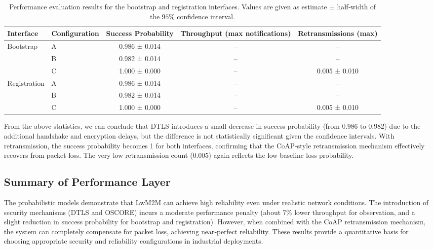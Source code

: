 \documentclass[a4paper,fleqn]{cas-sc}
\begin{document}
\begin{table}[htbp]
\centering
\caption{Performance evaluation results for the bootstrap and registration interfaces. Values are given as estimate ± half‑width of the $95\%$ confidence interval.}
\label{tab:bootstrap-registration-perf-results}
\begin{tabular}{llccc}
\toprule
\textbf{Interface} & \textbf{Configuration} & \textbf{Success Probability} & \textbf{Throughput (max notifications)} & \textbf{Retransmissions (max)} \\
\midrule
\multirow{3}{*}{Bootstrap}
 & A & 0.986 ± 0.014  & – & – \\
 & B & 0.982 ± 0.014  & – & – \\
 & C & 1.000 ± 0.000  & – & 0.005 ± 0.010 \\
\midrule
\multirow{3}{*}{Registration}
 & A & 0.986 ± 0.014  & – & – \\
 & B & 0.982 ± 0.014  & – & – \\
 & C & 1.000 ± 0.000  & – & 0.005 ± 0.010 \\
\bottomrule
\end{tabular}
\end{table}

From the above statistics, we can conclude that DTLS introduces a small decrease in success probability (from 0.986 to 0.982) due to the additional handshake and encryption delays, but the difference is not statistically significant given the confidence intervals.
With retransmission, the success probability becomes 1 for both interfaces, confirming that the CoAP‑style retransmission mechanism effectively recovers from packet loss.
The very low retransmission count (0.005) again reflects the low baseline loss probability.

\subsection{Summary of Performance Layer}
The probabilistic models demonstrate that LwM2M can achieve high reliability even under realistic network conditions. The introduction of security mechanisms (DTLS and OSCORE) incurs a moderate performance penalty (about $7\%$ lower throughput for observation, and a slight reduction in success probability for bootstrap and registration). However, when combined with the CoAP retransmission mechanism, the system can completely compensate for packet loss, achieving near‑perfect reliability. These results provide a quantitative basis for choosing appropriate security and reliability configurations in industrial deployments.
\end{document}
